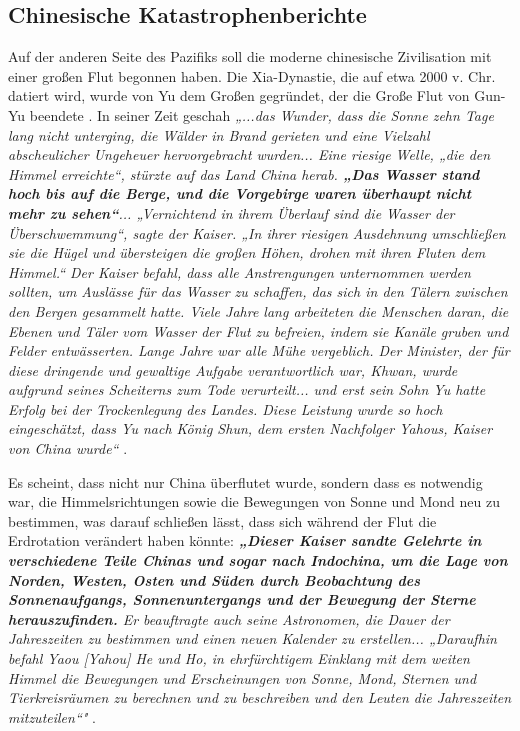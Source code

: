 \documentclass[10pt,twocolumn,letterpaper]{article}
\begin{document}
\subsection{Chinesische Katastrophenberichte}

Auf der anderen Seite des Pazifiks soll die moderne chinesische Zivilisation mit einer großen Flut begonnen haben. Die Xia-Dynastie, die auf etwa 2000 v. Chr. datiert wird, wurde von Yu dem Großen gegründet, der die Große Flut von Gun-Yu beendete \cite{6}. In seiner Zeit geschah \textit{„...das Wunder, dass die Sonne zehn Tage lang nicht unterging, die Wälder in Brand gerieten und eine Vielzahl abscheulicher Ungeheuer hervorgebracht wurden... Eine riesige Welle, „die den Himmel erreichte“, stürzte auf das Land China herab. \textbf{„Das Wasser stand hoch bis auf die Berge, und die Vorgebirge waren überhaupt nicht mehr zu sehen“}... „Vernichtend in ihrem Überlauf sind die Wasser der Überschwemmung“, sagte der Kaiser. „In ihrer riesigen Ausdehnung umschließen sie die Hügel und übersteigen die großen Höhen, drohen mit ihren Fluten dem Himmel.“ Der Kaiser befahl, dass alle Anstrengungen unternommen werden sollten, um Auslässe für das Wasser zu schaffen, das sich in den Tälern zwischen den Bergen gesammelt hatte. Viele Jahre lang arbeiteten die Menschen daran, die Ebenen und Täler vom Wasser der Flut zu befreien, indem sie Kanäle gruben und Felder entwässerten. Lange Jahre war alle Mühe vergeblich. Der Minister, der für diese dringende und gewaltige Aufgabe verantwortlich war, Khwan, wurde aufgrund seines Scheiterns zum Tode verurteilt... und erst sein Sohn Yu hatte Erfolg bei der Trockenlegung des Landes. Diese Leistung wurde so hoch eingeschätzt, dass Yu nach König Shun, dem ersten Nachfolger Yahous, Kaiser von China wurde“} \cite{5}.

Es scheint, dass nicht nur China überflutet wurde, sondern dass es notwendig war, die Himmelsrichtungen sowie die Bewegungen von Sonne und Mond neu zu bestimmen, was darauf schließen lässt, dass sich während der Flut die Erdrotation verändert haben könnte: \textit{\textbf{„Dieser Kaiser sandte Gelehrte in verschiedene Teile Chinas und sogar nach Indochina, um die Lage von Norden, Westen, Osten und Süden durch Beobachtung des Sonnenaufgangs, Sonnenuntergangs und der Bewegung der Sterne herauszufinden.} Er beauftragte auch seine Astronomen, die Dauer der Jahreszeiten zu bestimmen und einen neuen Kalender zu erstellen... „Daraufhin befahl Yaou [Yahou] He und Ho, in ehrfürchtigem Einklang mit dem weiten Himmel die Bewegungen und Erscheinungen von Sonne, Mond, Sternen und Tierkreisräumen zu berechnen und zu beschreiben und den Leuten die Jahreszeiten mitzuteilen“"} \cite{5}.
\end{document}

